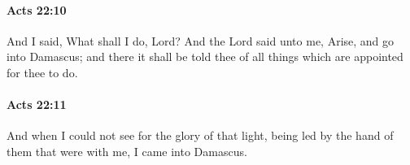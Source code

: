 		\paragraph{Acts 22:10} %
			\label{ACTS-22-10}

			And I said, What shall I do, Lord?  And the Lord said unto me, Arise, and go into Damascus; and there it shall be told thee of all things which are appointed for thee to do.

			\begin{framed}
			\scriptsize
				\begin{compactdesc}
					\item[SBLG] 
				\end{compactdesc}
			\end{framed}

		\paragraph{Acts 22:11} %
			\label{ACTS-22-11}

			And when I could not see for the glory of that light, being led by the hand of them that were with me, I came into Damascus.

